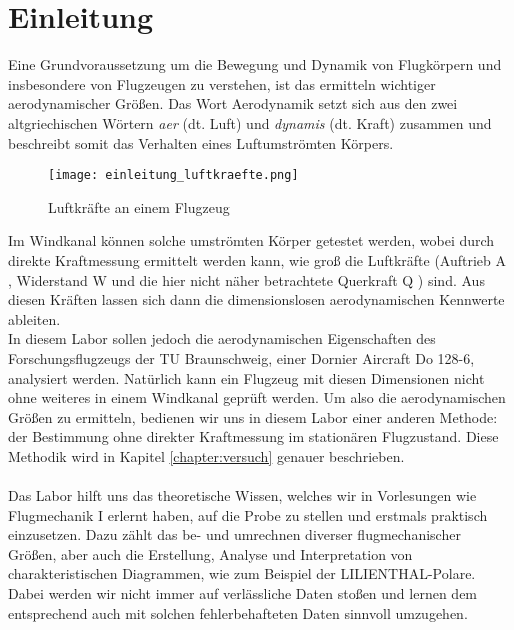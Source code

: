 \chapter{Einleitung}
\label{chapter:einleitung}

Eine Grundvoraussetzung um die Bewegung und Dynamik von Flugkörpern und insbesondere von Flugzeugen zu verstehen, ist das ermitteln wichtiger aerodynamischer Größen. Das Wort Aerodynamik setzt sich aus den zwei altgriechischen Wörtern \textit{aer} (dt. Luft) und \textit{dynamis} (dt. Kraft) zusammen und beschreibt somit das Verhalten eines Luftumströmten Körpers.

\begin{figure}[h] 
	\centering
	\label{figure:luftkraefte}
	\texttt{[image: einleitung\_luftkraefte.png]}
	\caption{Luftkräfte an einem Flugzeug \cite{labor-skript}}
\end{figure}

\noindent Im Windkanal können solche umströmten Körper getestet werden, wobei durch direkte Kraftmessung ermittelt werden kann, wie groß die Luftkräfte (Auftrieb A , Widerstand W  und die hier nicht näher betrachtete Querkraft Q ) sind. Aus diesen Kräften lassen sich dann die dimensionslosen aerodynamischen Kennwerte ableiten.\\
In diesem Labor sollen jedoch die aerodynamischen Eigenschaften des Forschungsflugzeugs der TU Braunschweig, einer Dornier Aircraft Do 128-6, analysiert werden. Natürlich kann ein Flugzeug mit diesen Dimensionen nicht ohne weiteres in einem Windkanal geprüft werden. Um also die aerodynamischen Größen zu ermitteln, bedienen wir uns in diesem Labor einer anderen Methode: der Bestimmung ohne direkter Kraftmessung im stationären Flugzustand. Diese Methodik wird in Kapitel \ref{chapter:versuch} genauer beschrieben.\\\\
Das Labor hilft uns das theoretische Wissen, welches wir in Vorlesungen wie Flugmechanik I erlernt haben, auf die Probe zu stellen und erstmals praktisch einzusetzen. Dazu zählt das be- und umrechnen diverser flugmechanischer Größen, aber auch die Erstellung, Analyse und Interpretation von charakteristischen Diagrammen, wie zum Beispiel der LILIENTHAL-Polare. Dabei werden wir nicht immer auf verlässliche Daten stoßen und lernen dem entsprechend auch mit solchen fehlerbehafteten Daten sinnvoll umzugehen.

